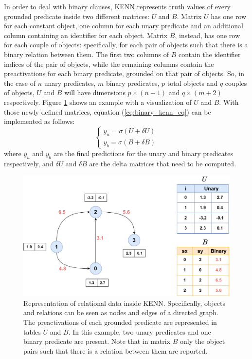 In order to deal with binary clauses, KENN represents truth values of every grounded predicate inside two different matrices: $U$ and $B$. Matrix $U$ has one row for each constant object, one column for each unary predicate and an additional column containing an identifier for each object. Matrix $B$, instead, has one row for each couple of objects: specifically, for each pair of objects such that there is a binary relation between them. The first two columns of $B$ contain the identifier indices of the pair of objects, while the remaining columns contain the preactivations for each binary predicate, grounded on that pair of objects. So, in the case of $n$ unary predicates, $m$ binary predicates, $p$ total objects and $q$ couples of objects, $U$ and $B$ will have dimensions $p \times (n+1)$ and $ q \times (m+2)$ respectively. Figure \ref{fig:KENNrelationalrepr} shows an example with a visualization of $U$ and $B$. With those newly defined matrices, equation (\ref{eq:binary_kenn_eq}) can be implemented as follows:
\begin{equation}
\begin{cases}
y_u = \sigma(U+\delta U)\\
y_b = \sigma(B + \delta B)
\end{cases}
\end{equation}
where $y_u$ and $y_b$ are the final predictions for the unary and binary predicates respectively, and $\delta U$ and $\delta B$ are the delta matrices that need to be computed.
 
 \begin{figure}
 	\centering
 	\includegraphics[width=0.7\linewidth]{figures/kenn_relational_representation2.pdf}
 	\caption{Representation of relational data inside KENN. Specifically, objects and relations can be seen as nodes and edges of a directed graph. The preactivations of each grounded predicate are represented in tables $U$ and $B$. In this example, two unary predicates and one binary predicate are present. Note that in matrix $B$ only the object pairs such that there is a relation between them are reported.}
 	\label{fig:KENNrelationalrepr}
 \end{figure}

